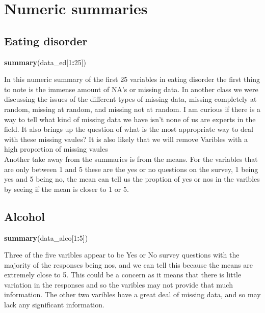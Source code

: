 \documentclass[]{article}
\newenvironment{Shaded}{\begin{snugshade}}{\end{snugshade}}
\newcommand{\KeywordTok}[1]{\textcolor[rgb]{0.13,0.29,0.53}{\textbf{#1}}}
\newcommand{\DecValTok}[1]{\textcolor[rgb]{0.00,0.00,0.81}{#1}}
\newcommand{\OperatorTok}[1]{\textcolor[rgb]{0.81,0.36,0.00}{\textbf{#1}}}
\newcommand{\NormalTok}[1]{#1}
\begin{document}
\section{Numeric summaries}\label{numeric-summaries}

\subsection{Eating disorder}\label{eating-disorder}

\begin{Shaded}
\begin{Highlighting}[]
\KeywordTok{summary}\NormalTok{(data_ed[}\DecValTok{1}\OperatorTok{:}\DecValTok{25}\NormalTok{])}
\end{Highlighting}
\end{Shaded}

In this numeric summary of the first 25 variables in eating disorder the
first thing to note is the immense amount of NA's or missing data. In
another class we were discussing the issues of the different types of
missing data, missing completely at random, missing at random, and
missing not at random. I am curious if there is a way to tell what kind
of missing data we have isn't none of us are experts in the field. It
also brings up the question of what is the most appropriate way to deal
with these missing vaules? It is also likely that we will remove
Varibles with a high proportion of missing vaules\\
Another take away from the summaries is from the means. For the
variables that are only between 1 and 5 these are the yes or no
questions on the survey, 1 being yes and 5 being no, the mean can tell
us the proption of yes or nos in the varibles by seeing if the mean is
closer to 1 or 5.

\subsection{Alcohol}\label{alcohol-1}

\begin{Shaded}
\begin{Highlighting}[]
\KeywordTok{summary}\NormalTok{(data_alco[}\DecValTok{1}\OperatorTok{:}\DecValTok{5}\NormalTok{])}
\end{Highlighting}
\end{Shaded}

Three of the five varibles appear to be Yes or No survey questions with
the majority of the responses being nos, and we can tell this because
the means are extremely close to 5. This could be a concern as it means
that there is little variation in the responses and so the varibles may
not provide that much information. The other two varibles have a great
deal of missing data, and so may lack any significant information.
\end{document}
